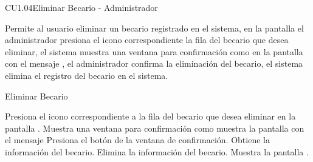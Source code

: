 \begin{UseCase}{CU1.04}{Eliminar Becario - Administrador}{
    Permite al usuario  eliminar un becario registrado en el sistema, en la pantalla  el administrador presiona el icono \faTrashO correspondiente la fila del becario que desea eliminar, el sistema muestra una ventana para confirmación como en la pantalla  con el mensaje , el administrador confirma la eliminación del becario, el sistema elimina el registro del becario en el sistema.
    
    
    
    
    \bigskip
}
		
\end{UseCase}
	
	\begin{UCtrayectoria}{Eliminar Becario }
	
		\UCpaso[\UCactor] Presiona el icono \faTrashO correspondiente a la fila del becario que desea eliminar en la pantalla .
		\UCpaso[\UCsist] Muestra una ventana para confirmación como muestra la pantalla  con el mensaje 
		\UCpaso[\UCactor]Presiona el botón  de la ventana de confirmación.
		\UCpaso[\UCsist] Obtiene la información del becario.
		\UCpaso[\UCsist] Elimina la información del becario.
		\UCpaso[\UCsist] Muestra la pantalla . 
       
		
	\end{UCtrayectoria}

